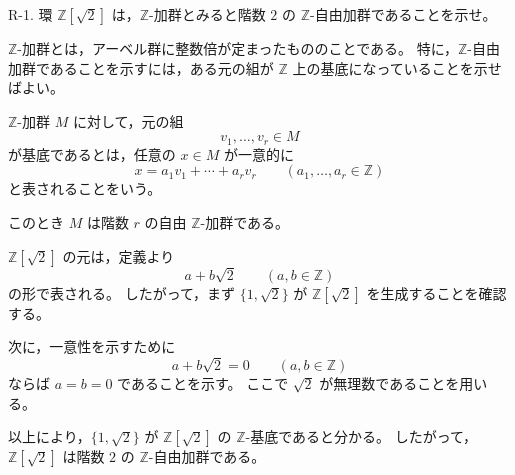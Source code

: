 
\begin{exercise}
	R-1. 環 $\mathbb{Z}[\sqrt{2}]$ は，$\mathbb{Z}$-加群とみると階数 $2$ の
	$\mathbb{Z}$-自由加群であることを示せ。
\end{exercise}

\begin{background}
	$\mathbb{Z}$-加群とは，アーベル群に整数倍が定まったもののことである。
	特に，$\mathbb{Z}$-自由加群であることを示すには，ある元の組が
	$\mathbb{Z}$ 上の基底になっていることを示せばよい。
	
	$\mathbb{Z}$-加群 $M$ に対して，元の組
	\[
	v_1,\dots,v_r\in M
	\]
	が基底であるとは，任意の $x\in M$ が一意的に
	\[
	x=a_1v_1+\cdots+a_rv_r
	\qquad
	(a_1,\dots,a_r\in\mathbb{Z})
	\]
	と表されることをいう。
	
	このとき $M$ は階数 $r$ の自由 $\mathbb{Z}$-加群である。
\end{background}

\begin{strategy}
	$\mathbb{Z}[\sqrt{2}]$ の元は，定義より
	\[
	a+b\sqrt{2}
	\qquad
	(a,b\in\mathbb{Z})
	\]
	の形で表される。
	したがって，まず $\{1,\sqrt{2}\}$ が
	$\mathbb{Z}[\sqrt{2}]$ を生成することを確認する。
	
	次に，一意性を示すために
	\[
	a+b\sqrt{2}=0
	\qquad
	(a,b\in\mathbb{Z})
	\]
	ならば $a=b=0$ であることを示す。
	ここで $\sqrt{2}$ が無理数であることを用いる。
	
	以上により，$\{1,\sqrt{2}\}$ が
	$\mathbb{Z}[\sqrt{2}]$ の $\mathbb{Z}$-基底であると分かる。
	したがって，$\mathbb{Z}[\sqrt{2}]$ は階数 $2$ の
	$\mathbb{Z}$-自由加群である。
\end{strategy}